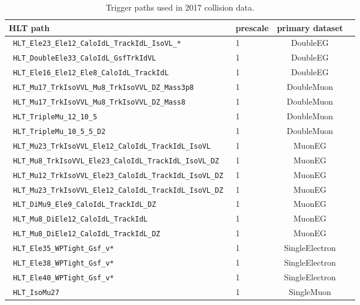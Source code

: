 \begin{table}[h]
\scriptsize
    \centering
    \begin{tabular}{|l|l|c|l|}
\hline %
HLT path                                                                               & prescale  & primary dataset \\
\hline %
\verb| HLT_Ele23_Ele12_CaloIdL_TrackIdL_IsoVL_*           |  & 1 & DoubleEG \\
\verb| HLT_DoubleEle33_CaloIdL_GsfTrkIdVL                 |  & 1 & DoubleEG \\
\verb| HLT_Ele16_Ele12_Ele8_CaloIdL_TrackIdL              |  & 1 & DoubleEG \\
\verb| HLT_Mu17_TrkIsoVVL_Mu8_TrkIsoVVL_DZ_Mass3p8        |  & 1 & DoubleMuon \\
\verb| HLT_Mu17_TrkIsoVVL_Mu8_TrkIsoVVL_DZ_Mass8          |  & 1 & DoubleMuon \\
\verb| HLT_TripleMu_12_10_5                               |  & 1 & DoubleMuon \\
\verb| HLT_TripleMu_10_5_5_D2                             |  & 1 & DoubleMuon \\
\verb| HLT_Mu23_TrkIsoVVL_Ele12_CaloIdL_TrackIdL_IsoVL    | & 1 & MuonEG \\
\verb| HLT_Mu8_TrkIsoVVL_Ele23_CaloIdL_TrackIdL_IsoVL_DZ  | & 1 & MuonEG \\
\verb| HLT_Mu12_TrkIsoVVL_Ele23_CaloIdL_TrackIdL_IsoVL_DZ | & 1 & MuonEG \\
\verb| HLT_Mu23_TrkIsoVVL_Ele12_CaloIdL_TrackIdL_IsoVL_DZ | & 1 & MuonEG \\
\verb| HLT_DiMu9_Ele9_CaloIdL_TrackIdL_DZ                 | & 1 & MuonEG \\
\verb| HLT_Mu8_DiEle12_CaloIdL_TrackIdL                   | & 1 & MuonEG \\
\verb| HLT_Mu8_DiEle12_CaloIdL_TrackIdL_DZ                | & 1 & MuonEG \\
\verb| HLT_Ele35_WPTight_Gsf_v*                           | & 1 & SingleElectron \\
\verb| HLT_Ele38_WPTight_Gsf_v*                           | & 1 & SingleElectron \\
\verb| HLT_Ele40_WPTight_Gsf_v*                           | & 1 & SingleElectron \\
\verb| HLT_IsoMu27                                        | & 1 & SingleMuon \\
\hline %
    \end{tabular}
\small
    \caption{Trigger paths used in 2017 collision data.  }
    \label{tab:triggerPathsB}
\end{table}


